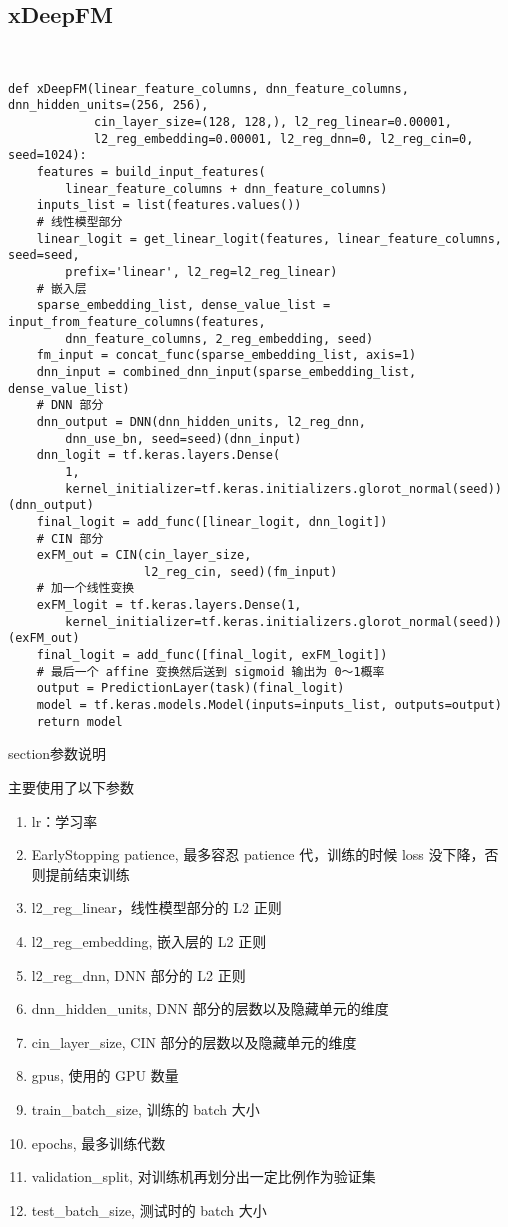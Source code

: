 \documentclass[degree=master,cjk-font=noto]{thuthesis}
\begin{document}
\subsection{xDeepFM}

\
  \begin{verbatim}
def xDeepFM(linear_feature_columns, dnn_feature_columns, dnn_hidden_units=(256, 256),
            cin_layer_size=(128, 128,), l2_reg_linear=0.00001,
            l2_reg_embedding=0.00001, l2_reg_dnn=0, l2_reg_cin=0, seed=1024):
    features = build_input_features(
        linear_feature_columns + dnn_feature_columns)
    inputs_list = list(features.values())
    # 线性模型部分
    linear_logit = get_linear_logit(features, linear_feature_columns, seed=seed,
        prefix='linear', l2_reg=l2_reg_linear)
    # 嵌入层
    sparse_embedding_list, dense_value_list = input_from_feature_columns(features,
        dnn_feature_columns, 2_reg_embedding, seed)
    fm_input = concat_func(sparse_embedding_list, axis=1)
    dnn_input = combined_dnn_input(sparse_embedding_list, dense_value_list)
    # DNN 部分
    dnn_output = DNN(dnn_hidden_units, l2_reg_dnn,
        dnn_use_bn, seed=seed)(dnn_input)
    dnn_logit = tf.keras.layers.Dense(
        1,
        kernel_initializer=tf.keras.initializers.glorot_normal(seed))(dnn_output)
    final_logit = add_func([linear_logit, dnn_logit])
    # CIN 部分
    exFM_out = CIN(cin_layer_size,
                   l2_reg_cin, seed)(fm_input)
    # 加一个线性变换
    exFM_logit = tf.keras.layers.Dense(1,
        kernel_initializer=tf.keras.initializers.glorot_normal(seed))(exFM_out)
    final_logit = add_func([final_logit, exFM_logit])
    # 最后一个 affine 变换然后送到 sigmoid 输出为 0～1概率
    output = PredictionLayer(task)(final_logit)
    model = tf.keras.models.Model(inputs=inputs_list, outputs=output)
    return model
  \end{verbatim}

section{参数说明}

主要使用了以下参数

\begin{enumerate}
  \item lr：学习率
  \item EarlyStopping patience, 最多容忍 patience 代，训练的时候 loss 没下降，否则提前结束训练
  \item l2\_reg\_linear，线性模型部分的 L2 正则
  \item l2\_reg\_embedding, 嵌入层的 L2 正则
  \item l2\_reg\_dnn, DNN 部分的 L2 正则
  \item dnn\_hidden\_units, DNN 部分的层数以及隐藏单元的维度
  \item cin\_layer\_size, CIN 部分的层数以及隐藏单元的维度
  \item gpus, 使用的 GPU 数量
  \item train\_batch\_size, 训练的 batch 大小
  \item epochs, 最多训练代数
  \item validation\_split, 对训练机再划分出一定比例作为验证集
  \item test\_batch\_size, 测试时的 batch 大小
\end{enumerate}
\end{document}
